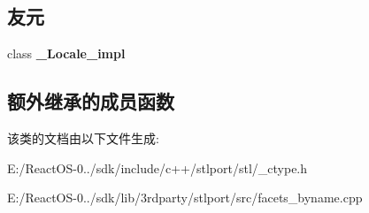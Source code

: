 \subsection*{友元}
\begin{DoxyCompactItemize}
\item 
\mbox{\label{classctype__byname_3_01char_01_4_ae9c09ac7cd16ad35f8fdb1587ac77eb8}} 
class {\bfseries \+\_\+\+Locale\+\_\+impl}
\end{DoxyCompactItemize}
\subsection*{额外继承的成员函数}


该类的文档由以下文件生成\+:\begin{DoxyCompactItemize}
\item 
E\+:/\+React\+O\+S-\/0../sdk/include/c++/stlport/stl/\+\_\+ctype.\+h\item 
E\+:/\+React\+O\+S-\/0../sdk/lib/3rdparty/stlport/src/facets\+\_\+byname.\+cpp\end{DoxyCompactItemize}
